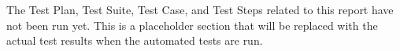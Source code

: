 The Test Plan, Test Suite, Test Case, and Test Steps related to this report have
not been run yet.  This is a placeholder section that will be replaced with the
actual test results when the automated tests are run.
